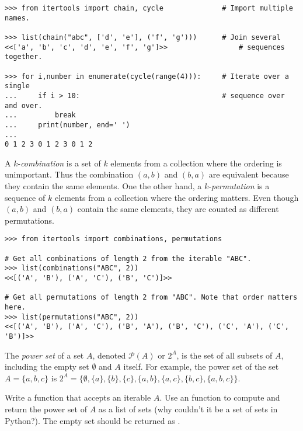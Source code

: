 \begin{lstlisting}
>>> from itertools import chain, cycle              # Import multiple names.

>>> list(chain("abc", ['d', 'e'], ('f', 'g')))      # Join several
<<['a', 'b', 'c', 'd', 'e', 'f', 'g']>>                 # sequences together.

>>> for i,number in enumerate(cycle(range(4))):     # Iterate over a single
...     if i > 10:                                  # sequence over and over.
...         break
...     print(number, end=' ')
...
0 1 2 3 0 1 2 3 0 1 2
\end{lstlisting}

A $k$-\emph{combination} is a set of $k$ elements from a collection where the ordering is unimportant.
Thus the combination $(a,b)$ and $(b,a)$ are equivalent because they contain the same elements.
One the other hand, a $k$-\emph{permutation} is a sequence of $k$ elements from a collection where the ordering matters.
Even though $(a,b)$ and $(b,a)$ contain the same elements, they are counted as different permutations.

\begin{lstlisting}
>>> from itertools import combinations, permutations

# Get all combinations of length 2 from the iterable "ABC".
>>> list(combinations("ABC", 2))
<<[('A', 'B'), ('A', 'C'), ('B', 'C')]>>

# Get all permutations of length 2 from "ABC". Note that order matters here.
>>> list(permutations("ABC", 2))
<<[('A', 'B'), ('A', 'C'), ('B', 'A'), ('B', 'C'), ('C', 'A'), ('C', 'B')]>>
\end{lstlisting}

\begin{problem}
The \emph{power set} of a set $A$, denoted $\mathcal{P}(A)$ or $2^A$, is the set of all subsets of $A$, including the empty set $\emptyset$ and $A$ itself.
For example, the power set of the set $A = \{a, b, c\}$ is $2^A = \{\emptyset, \{a\}, \{b\}, \{c\}, \{a,b\}, \{a,c\}, \{b,c\}, \{a,b,c\}\}$.

Write a function that accepts an iterable $A$.
Use an  function to compute and return the power set of $A$ as a list of sets (why couldn't it be a set of sets in Python?).
The empty set should be returned as .
\end{problem}


